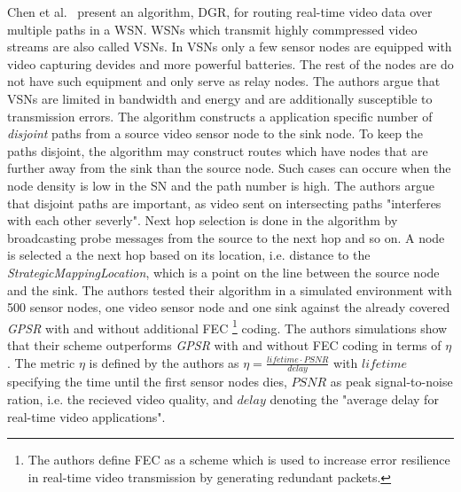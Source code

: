 Chen et al.~\cite{chen2011itinerary} present an algorithm, \ac{DGR}, for
routing real-time video data over multiple paths in a \ac{WSN}. \acp{WSN} which
transmit highly commpressed video streams are also called \acp{VSN}. In
\acp{VSN} only a few sensor nodes are equipped with video capturing devides and
more powerful batteries. The rest of the nodes are do not have such equipment
and only serve as relay nodes. The authors argue that \acp{VSN} are limited in
bandwidth and energy and are additionally susceptible to transmission errors.
The algorithm constructs a application specific number of \textit{disjoint}
paths from a source video sensor node to the sink node. To keep the paths
disjoint, the algorithm may construct routes which have nodes that are further
away from the sink than the source node. Such cases can occure when the node
density is low in the \ac{SN} and the path number is high. The authors argue
that disjoint paths are important, as video sent on intersecting paths
"interferes with each other severly". Next hop selection is done in the
algorithm by broadcasting probe messages from the source to the next hop and so
on. A node is selected a the next hop based on its location, i.e. distance to
the \textit{StrategicMappingLocation}, which is a point on the line between the
source node and the sink. The authors tested their algorithm in a simulated
environment with 500 sensor nodes, one video sensor node and one sink against
the already covered \textit{GPSR} with and without additional \ac{FEC}
\footnote{The authors define \ac{FEC} as a scheme which is used to increase
error resilience in real-time video transmission by generating redundant
packets.} coding. The authors simulations show that their scheme outperforms
\textit{GPSR} with and without \ac{FEC} coding in terms of $ \eta $. The metric
$ \eta $ is defined by the authors as $ \eta = \frac{lifetime \cdot
PSNR}{delay}$ with $ lifetime $ specifying the time until the first sensor
nodes dies, $ PSNR $ as peak signal-to-noise ration, i.e. the recieved video
quality, and $ delay $ denoting the "average delay for real-time video
applications".


